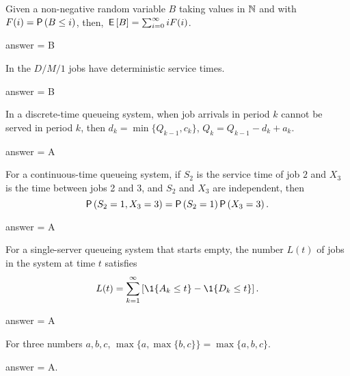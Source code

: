\begin{exercise}[201802]
Given a non-negative random variable $B$ taking values in $\mathbb{N}$ and with $F(i) = \P{B\leq i}$, 
then, $\,\mathsf{E}\left[B\right] = \sum_{i=0}^\infty i F(i)$.
\begin{solution}
answer = B
\end{solution}
\end{exercise}

\begin{exercise}[201802]
In the  $D/M/1$ jobs have deterministic service times.
\begin{solution}
answer = B
\end{solution}
\end{exercise}

\begin{exercise}[201802]
In a discrete-time queueing system, when job arrivals in period $k$ cannot be served in period $k$, then $d_k = \min\{Q_{k-1}, c_k\}$, $Q_k = Q_{k-1} -d_k + a_k.$
\begin{solution}
answer = A
\end{solution}
\end{exercise}

\begin{exercise}[201802]
For a continuous-time queueing system, if $S_2$ is the service time of job $2$ and $X_3$ is the time between jobs 2 and 3, and $S_2$ and $X_3$ are independent, then
\begin{equation*}
  \P{S_{2}=1, X_3=3} = \P{S_{2}=1}\P{X_3=3}.
\end{equation*}
\begin{solution}
answer = A
\end{solution}
\end{exercise}

\begin{exercise}[201802]
For a single-server queueing system that starts empty,  the number $L(t)$ of jobs in the system at time $t$ satisfies
  \begin{equation*}
      L(t) = \sum_{k=1}^\infty \left[\1{A_k \leq t} -  \1{D_k \leq t}\right].
  \end{equation*}
\begin{solution}
answer = A
\end{solution}
\end{exercise}


\begin{exercise}[201802]
For three numbers $a,b,c$, $\max\{a, \max\{b, c\}\} = \max\{a, b, c\}$. 
\begin{solution}
answer = A.
\end{solution}
\end{exercise}

